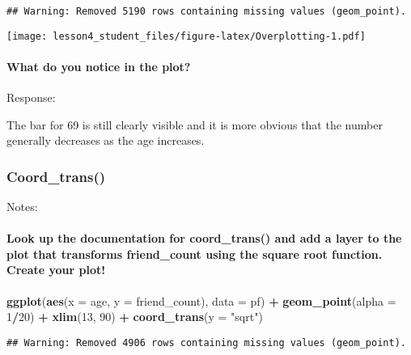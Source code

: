 \documentclass[]{article}
\newenvironment{Shaded}{\begin{snugshade}}{\end{snugshade}}
\newcommand{\KeywordTok}[1]{\textcolor[rgb]{0.13,0.29,0.53}{\textbf{#1}}}
\newcommand{\DataTypeTok}[1]{\textcolor[rgb]{0.13,0.29,0.53}{#1}}
\newcommand{\DecValTok}[1]{\textcolor[rgb]{0.00,0.00,0.81}{#1}}
\newcommand{\StringTok}[1]{\textcolor[rgb]{0.31,0.60,0.02}{#1}}
\newcommand{\OperatorTok}[1]{\textcolor[rgb]{0.81,0.36,0.00}{\textbf{#1}}}
\newcommand{\NormalTok}[1]{#1}
\let\oldparagraph\paragraph
\renewcommand{\paragraph}[1]{\oldparagraph{#1}\mbox{}}
\begin{document}
\begin{verbatim}
## Warning: Removed 5190 rows containing missing values (geom_point).
\end{verbatim}

\texttt{[image: lesson4\_student\_files/figure-latex/Overplotting-1.pdf]}

\paragraph{What do you notice in the
plot?}\label{what-do-you-notice-in-the-plot}

Response:

The bar for 69 is still clearly visible and it is more obvious that the
number generally decreases as the age increases.

\subsubsection{Coord\_trans()}\label{coord_trans}

Notes:

\paragraph{Look up the documentation for coord\_trans() and add a layer
to the plot that transforms friend\_count using the square root
function. Create your
plot!}\label{look-up-the-documentation-for-coord_trans-and-add-a-layer-to-the-plot-that-transforms-friend_count-using-the-square-root-function.-create-your-plot}

\begin{Shaded}
\begin{Highlighting}[]
\KeywordTok{ggplot}\NormalTok{(}\KeywordTok{aes}\NormalTok{(}\DataTypeTok{x =}\NormalTok{ age, }\DataTypeTok{y =}\NormalTok{ friend_count), }\DataTypeTok{data =}\NormalTok{ pf) }\OperatorTok{+}
\StringTok{  }\KeywordTok{geom_point}\NormalTok{(}\DataTypeTok{alpha =} \DecValTok{1}\OperatorTok{/}\DecValTok{20}\NormalTok{) }\OperatorTok{+}
\StringTok{  }\KeywordTok{xlim}\NormalTok{(}\DecValTok{13}\NormalTok{, }\DecValTok{90}\NormalTok{) }\OperatorTok{+}
\StringTok{  }\KeywordTok{coord_trans}\NormalTok{(}\DataTypeTok{y =} \StringTok{"sqrt"}\NormalTok{)}
\end{Highlighting}
\end{Shaded}

\begin{verbatim}
## Warning: Removed 4906 rows containing missing values (geom_point).
\end{verbatim}
\end{document}
